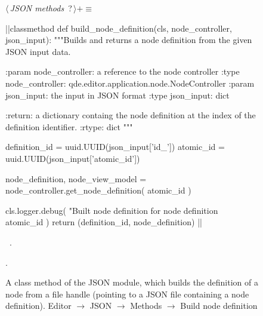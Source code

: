 \documentclass[%
    a4paper,    %
    justified,  %
    nobib,      %
    openany     %
]{tufte-book}
\makeatletter
\renewcommand{\label}[1]{\@tufte@label{##1}}%
\makeatother
\begin{document}
\begin{figure}
\begin{flushleft} \small
\begin{minipage}{\linewidth}\label{scrap140}\raggedright\small
{} $\langle\,${\itshape JSON methods}\nobreak\ {\footnotesize {?}}$\,\rangle+\equiv$
\vspace{-1ex}
\begin{pythoncode}
|\normalfont{}\fontfamily{}|classmethod
def build_node_definition(cls, node_controller, json_input):
    """Builds and returns a node definition from the given JSON input data.

    :param node_controller: a reference to the node controller
    :type  node_controller: qde.editor.application.node.NodeController
    :param json_input: the input in JSON format
    :type  json_input: dict

    :return: a dictionary containg the node definition at the index of the
             definition identifier.
    :rtype:  dict
    """

    definition_id   = uuid.UUID(json_input['id_'])
    atomic_id       = uuid.UUID(json_input['atomic_id'])

    node_definition, node_view_model = node_controller.get_node_definition(
        atomic_id
    )

    cls.logger.debug(
        "Built node definition for node definition %
        atomic_id
    )
    return (definition_id, node_definition)
|\NWsep|
\end{pythoncode}
\vspace{1.5ex}
\footnotesize
\begin{list}{}{\setlength{\itemsep}{-\parsep}\setlength{\itemindent}{-\leftmargin}}
\item \NWtxtMacroDefBy\ .
\item {\NWtxtMacroNoRef}.

\item{}
\end{list}
\end{minipage}\vspace{4ex}
\end{flushleft}
\caption{A class method of the JSON module, which builds the definition of a node
  from a file handle (pointing to a JSON file containing a node
  definition).
  \newline{}\newline{}Editor $\rightarrow$ JSON $\rightarrow$
  Methods $\rightarrow$ Build node definition}
\label{editor:lst:json:methods:build-node-definition}
\end{figure}
\end{document}
